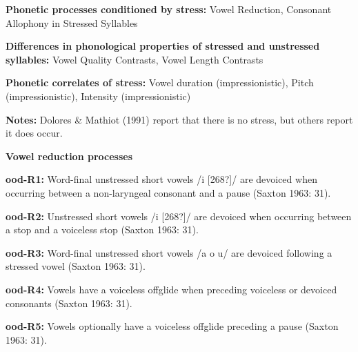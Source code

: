 \begin{styleBody}
\textbf{Phonetic processes conditioned by stress:} Vowel Reduction, Consonant Allophony in Stressed Syllables
\end{styleBody}

\begin{styleBody}
\textbf{Differences in phonological properties of stressed and unstressed syllables:} Vowel Quality Contrasts, Vowel Length Contrasts
\end{styleBody}

\begin{styleBody}
\textbf{Phonetic correlates of stress: }Vowel duration (impressionistic), Pitch (impressionistic), Intensity (impressionistic)
\end{styleBody}

\begin{styleBody}
\textbf{Notes: }Dolores \& Mathiot (1991) report that there is no stress, but others report it does occur.
\end{styleBody}

\begin{styleBody}
\textbf{Vowel reduction processes}
\end{styleBody}

\begin{styleBody}
\textbf{ood-R1:} Word-final unstressed short vowels /i [268?]/ are devoiced when occurring between a non-laryngeal consonant and a pause (Saxton 1963: 31).
\end{styleBody}

\begin{styleBody}
\textbf{ood-R2:} Unstressed short vowels /i [268?]/ are devoiced when occurring between a stop and a voiceless stop (Saxton 1963: 31).
\end{styleBody}

\begin{styleBody}
\textbf{ood-R3:} Word-final unstressed short vowels /a o u/ are devoiced following a stressed vowel (Saxton 1963: 31).
\end{styleBody}

\begin{styleBody}
\textbf{ood-R4:} Vowels have a voiceless offglide when preceding voiceless or devoiced consonants (Saxton 1963: 31).
\end{styleBody}

\begin{styleBody}
\textbf{ood-R5:} Vowels optionally have a voiceless offglide preceding a pause (Saxton 1963: 31).
\end{styleBody}

